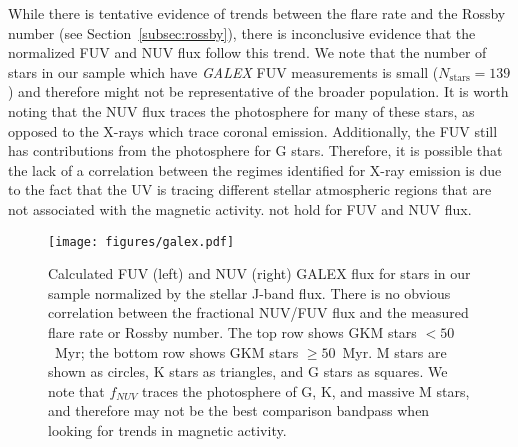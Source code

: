 \documentclass[twocolumn, linenumbers]{aastex631}
\begin{document}
While there is tentative evidence of trends between the flare rate and the Rossby number (see Section~\ref{subsec:rossby}), there is inconclusive evidence that the normalized FUV and NUV flux
follow this trend. We note that  the number of stars in our sample which have \textit{GALEX} FUV measurements is small ($N_\textrm{stars} = 139$) and therefore might not be representative of the
broader population. It is worth noting that the NUV flux traces the photosphere for many of these stars, as opposed to the X-rays which trace coronal emission. Additionally, the FUV still has
contributions from the photosphere for G stars. Therefore, it is possible that the lack of a correlation between the regimes identified for X-ray emission is due to the fact that the UV is tracing
different stellar atmospheric regions that are not associated with the magnetic activity. %
not hold for FUV and NUV flux.

\begin{figure}[ht!]
    \begin{centering}
        \texttt{[image: figures/galex.pdf]}
        \caption{
            Calculated FUV (left) and NUV (right) GALEX flux for stars in our
            sample normalized  by the stellar J-band flux.
            There is no obvious correlation between the fractional NUV/FUV flux and the measured
            flare rate or Rossby number.
            The top row shows GKM stars $<50$~Myr; the bottom row
            shows GKM stars $\geq 50$~Myr. M stars are shown as circles, K stars as
            triangles, and G stars as squares. We note that $f_{NUV}$ traces the
            photosphere of G, K, and massive M stars, and therefore may not be the best comparison
            bandpass when looking for trends in magnetic activity.
        }
        \label{fig:galex}
    \end{centering}
\end{figure}
\end{document}

